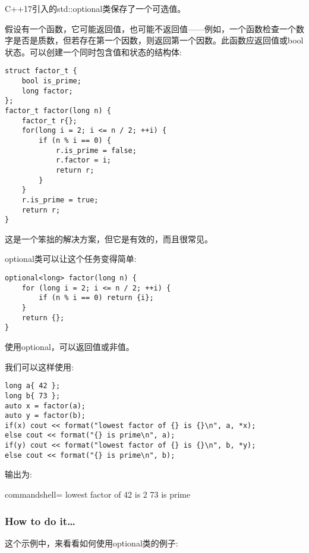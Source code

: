 
C++17引入的std::optional类保存了一个可选值。

假设有一个函数，它可能返回值，也可能不返回值——例如，一个函数检查一个数字是否是质数，但若存在第一个因数，则返回第一个因数。此函数应返回值或bool状态。可以创建一个同时包含值和状态的结构体:

\begin{lstlisting}[style=styleCXX]
struct factor_t {
	bool is_prime;
	long factor;
};
factor_t factor(long n) {
	factor_t r{};
	for(long i = 2; i <= n / 2; ++i) {
		if (n % i == 0) {
			r.is_prime = false;
			r.factor = i;
			return r;
		}
	}
	r.is_prime = true;
	return r;
}
\end{lstlisting}

这是一个笨拙的解决方案，但它是有效的，而且很常见。

optional类可以让这个任务变得简单:

\begin{lstlisting}[style=styleCXX]
optional<long> factor(long n) {
	for (long i = 2; i <= n / 2; ++i) {
		if (n % i == 0) return {i};
	}
	return {};
}
\end{lstlisting}

使用optional，可以返回值或非值。

我们可以这样使用:

\begin{lstlisting}[style=styleCXX]
long a{ 42 };
long b{ 73 };
auto x = factor(a);
auto y = factor(b);
if(x) cout << format("lowest factor of {} is {}\n", a, *x);
else cout << format("{} is prime\n", a);
if(y) cout << format("lowest factor of {} is {}\n", b, *y);
else cout << format("{} is prime\n", b);
\end{lstlisting}

输出为:

\begin{tcblisting}{commandshell={}}
lowest factor of 42 is 2
73 is prime
\end{tcblisting}

\subsubsection{How to do it…}

这个示例中，来看看如何使用optional类的例子:

